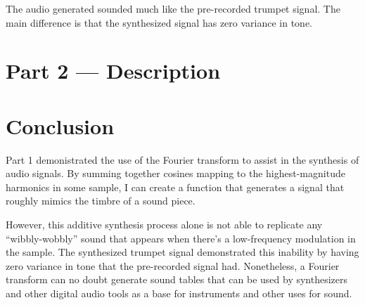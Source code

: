 \documentclass[11pt]{article}
\begin{document}
The audio generated sounded much like the pre-recorded trumpet signal.
The main difference is that the synthesized signal has zero variance in tone.

\pagebreak
\section{Part 2 --- Description}

\section{Conclusion}

Part 1 demonistrated the use of the Fourier transform to assist in the synthesis of audio signals.
By summing together cosines mapping to the highest-magnitude harmonics in some sample, I can create a function that generates a signal that roughly mimics the timbre of a sound piece.

However, this additive synthesis process alone is not able to replicate any ``wibbly-wobbly'' sound that appears when there's a low-frequency modulation in the sample.
The synthesized trumpet signal demonstrated this inability by having zero variance in tone that the pre-recorded signal had.
Nonetheless, a Fourier transform can no doubt generate sound tables that can be used by synthesizers and other digital audio tools as a base for instruments and other uses for sound.
\end{document}
